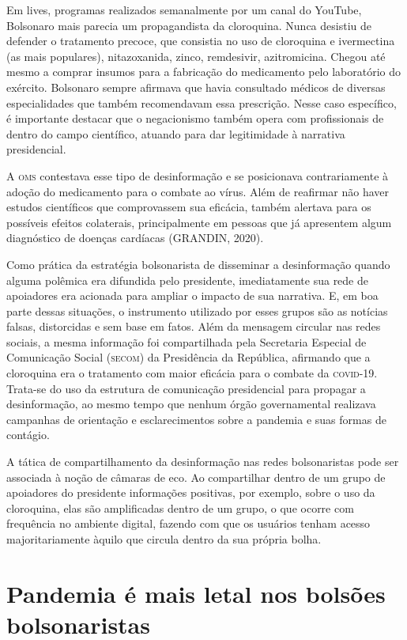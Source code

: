 Em lives, programas realizados semanalmente por um canal do YouTube,
Bolsonaro mais parecia um propagandista da cloroquina. Nunca desistiu de
defender o tratamento precoce, que consistia no uso de cloroquina e
ivermectina (as mais populares), nitazoxanida, zinco,
remdesivir, azitromicina. Chegou até mesmo a comprar insumos para a
fabricação do medicamento pelo laboratório do exército. Bolsonaro sempre
afirmava que havia consultado médicos de diversas especialidades que
também recomendavam essa prescrição. Nesse caso específico, é importante
destacar que o negacionismo também opera com profissionais de dentro do
campo científico, atuando para dar legitimidade à narrativa
presidencial.

A \textsc{oms} contestava esse tipo de desinformação e se posicionava
contrariamente à adoção do medicamento para o combate ao vírus. Além de
reafirmar não haver estudos científicos que comprovassem sua eficácia,
também alertava para os possíveis efeitos colaterais, principalmente em
pessoas que já apresentem algum diagnóstico de doenças cardíacas
(GRANDIN, 2020).

Como prática da estratégia bolsonarista de disseminar a desinformação
quando alguma polêmica era difundida pelo presidente, imediatamente sua
rede de apoiadores era acionada para ampliar o impacto de sua narrativa.
E, em boa parte dessas situações, o instrumento utilizado por esses
grupos são as notícias falsas, distorcidas e sem base em fatos. Além da
mensagem circular nas redes sociais, a mesma informação foi compartilhada
pela Secretaria Especial de Comunicação Social (\textsc{\textsc{secom}}) da Presidência da
República, afirmando que a cloroquina era o tratamento com maior
eficácia para o combate da \textsc{covid-19}. Trata-se do uso da estrutura de
comunicação presidencial para propagar a desinformação, ao mesmo tempo que
nenhum órgão governamental realizava campanhas de orientação e
esclarecimentos sobre a pandemia e suas formas de contágio.

A tática de compartilhamento da desinformação nas redes bolsonaristas
pode ser associada à noção de câmaras de eco. Ao compartilhar dentro de
um grupo de apoiadores do presidente informações positivas, por exemplo,
sobre o uso da cloroquina, elas são amplificadas dentro de um grupo, o
que ocorre com frequência no ambiente digital, fazendo com que os
usuários tenham acesso majoritariamente àquilo que circula dentro da sua
própria bolha.

\section{Pandemia é mais letal nos bolsões bolsonaristas}

